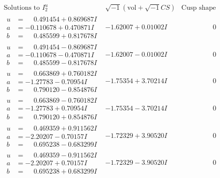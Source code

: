 \documentclass[1p]{elsarticle_modified}
\theoremstyle{definition}
\newcommand{\I}{\sqrt{-1}}
\begin{document}
$$\begin{array}{c|c|c}  
\text{Solutions to }I^u_{2}& \I (\text{vol} + \sqrt{-1}CS) & \text{Cusp shape}\\
 \hline 
\begin{aligned}
u &= \phantom{-}0.491454 + 0.869687 I \\
a &= -0.110678 + 0.470871 I \\
b &= \phantom{-}0.485599 + 0.817678 I\end{aligned}
 & -1.62007 + 0.01002 I & \phantom{-0.000000 } 0 \\ \hline\begin{aligned}
u &= \phantom{-}0.491454 - 0.869687 I \\
a &= -0.110678 - 0.470871 I \\
b &= \phantom{-}0.485599 - 0.817678 I\end{aligned}
 & -1.62007 - 0.01002 I & \phantom{-0.000000 } 0 \\ \hline\begin{aligned}
u &= \phantom{-}0.663869 + 0.760182 I \\
a &= -1.27783 - 0.70954 I \\
b &= \phantom{-}0.790120 - 0.854876 I\end{aligned}
 & -1.75354 + 3.70214 I & \phantom{-0.000000 } 0 \\ \hline\begin{aligned}
u &= \phantom{-}0.663869 - 0.760182 I \\
a &= -1.27783 + 0.70954 I \\
b &= \phantom{-}0.790120 + 0.854876 I\end{aligned}
 & -1.75354 - 3.70214 I & \phantom{-0.000000 } 0 \\ \hline\begin{aligned}
u &= \phantom{-}0.469359 + 0.911562 I \\
a &= -2.20207 - 0.70157 I \\
b &= \phantom{-}0.695238 - 0.683299 I\end{aligned}
 & -1.72329 + 3.90520 I & \phantom{-0.000000 } 0 \\ \hline\begin{aligned}
u &= \phantom{-}0.469359 - 0.911562 I \\
a &= -2.20207 + 0.70157 I \\
b &= \phantom{-}0.695238 + 0.683299 I\end{aligned}
 & -1.72329 - 3.90520 I & \phantom{-0.000000 } 0 \\ \hline\begin{aligned}

\end{aligned}
\end{array}$$
\end{document}

